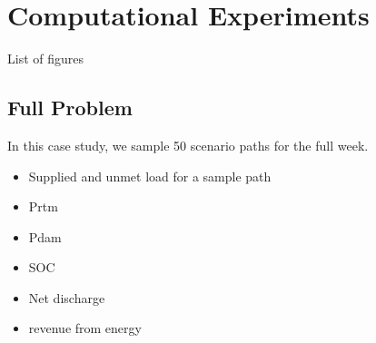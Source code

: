 \documentclass[11pt,twoside]{article}
\begin{document}
\section{Computational Experiments}\label{sec:exp}
List of figures

\subsection{Full Problem}
In this case study, we sample 50 scenario paths for the full week.  
\begin{itemize}
\item Supplied and unmet load for a sample path
\item Prtm
\item Pdam
\item SOC 
\item Net discharge
\item revenue from energy
\end{itemize}
\end{document}
